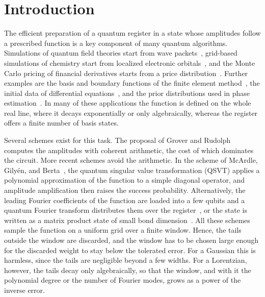 \section{Introduction}
\label{sec:intro}

The efficient preparation of a quantum register in a state whose
amplitudes follow a prescribed function is a key component of many
quantum algorithms.  Simulations of quantum field theories start
from wave packets~\cite{JordanLeePreskill2012}, grid-based
simulations of chemistry start from localized electronic
orbitals~\cite{ChanMeisterEtAl2022,KosugiEtAl2025}, and the Monte
Carlo pricing of financial derivatives starts from a price
distribution~\cite{StamatopoulosEtAl2020}.  Further examples are
the basis and boundary functions of the finite element
method~\cite{MontanaroPallister2016}, the initial data of
differential equations~\cite{BerryChildsOstranderWang2017}, and
the prior distributions used in phase
estimation~\cite{BerryEtAl2022QPE}.  In many of these applications
the function is defined on the whole real line, where it decays
exponentially or only algebraically, whereas the register offers
a finite number of basis states.

Several schemes exist for this task.  The proposal of Grover and
Rudolph~\cite{GroverRudolph2002} computes the amplitudes with
coherent arithmetic, the cost of which dominates the circuit.
More recent schemes avoid the arithmetic.  In the scheme of
McArdle, Gily\'en, and Berta~\cite{McArdleGilyenBerta2025}, the
quantum singular value transformation (QSVT) applies a polynomial
approximation of the function to a simple diagonal operator, and
amplitude amplification then raises the success probability.
Alternatively, the leading Fourier coefficients of the function
are loaded into a few qubits and a quantum Fourier transform
distributes them over the register~\cite{MoosaEtAl2023}, or the
state is written as a matrix product state of small bond
dimension~\cite{HolmesMatsuura2020,SanoHamamura2025}.  All these
schemes sample the function on a uniform grid over a finite
window.  Hence, the tails outside the window are discarded, and
the window has to be chosen large enough for the discarded weight
to stay below the tolerated error.  For a Gaussian this is
harmless, since the tails are negligible beyond a few widths.  For
a Lorentzian, however, the tails decay only algebraically, so that
the window, and with it the polynomial degree or the number of
Fourier modes, grows as a power of the inverse error.

